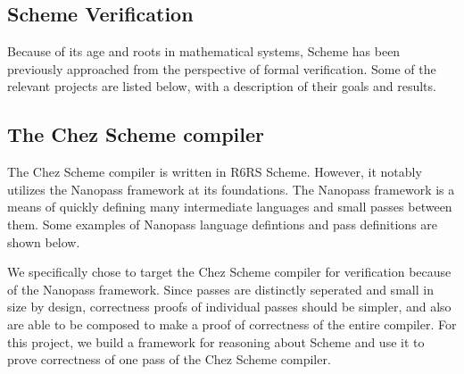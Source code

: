 \subsection{Scheme Verification}
Because of its age and roots in mathematical systems, Scheme has been previously approached from the perspective of formal verification. Some of the relevant projects are listed below, with a description of their goals and results.
\subsection{The Chez Scheme compiler}
The Chez Scheme compiler is written in R6RS Scheme. However, it notably utilizes the Nanopass framework at its foundations. The Nanopass framework is a means of quickly defining many intermediate languages and small passes between them. Some examples of Nanopass language defintions and pass definitions are shown below.

We specifically chose to target the Chez Scheme compiler for verification because of the Nanopass framework. Since passes are distinctly seperated and small in size by design, correctness proofs of individual passes should be simpler, and also are able to be composed to make a proof of correctness of the entire compiler. For this project, we build a framework for reasoning about Scheme and use it to prove correctness of one pass of the Chez Scheme compiler.

